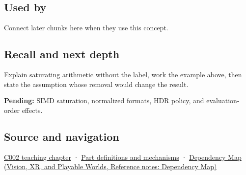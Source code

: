\subsection{Used by}\label{appendix-3999c6209649-used-by}

\hypertarget{appendix-3999c6209649-used-by}{}

Connect later chunks here when they use this concept.

\subsection{Recall and next depth}\label{appendix-3999c6209649-recall-and-next-depth}

\hypertarget{appendix-3999c6209649-recall-and-next-depth}{}

Explain saturating arithmetic without the label, work the example above, then state the assumption whose removal would change the result.

\textbf{Pending:} SIMD saturation, normalized formats, HDR policy, and evaluation-order effects.

\subsection{Source and navigation}\label{appendix-3999c6209649-source-and-navigation}

\hypertarget{appendix-3999c6209649-source-and-navigation}{}

\hyperref[01-foundations-i-ch001-arithmetic-becomes-a-policy]{C002 teaching chapter} · \hyperref[appendix-fd090d982a15]{Part definitions and mechanisms} · \href{../07-Vision-XR-and-Playable-Worlds/main.pdf\#nameddest=appendix-4ad47bdd269a}{Dependency Map (Vision, XR, and Playable Worlds, Reference notes: Dependency Map)}
